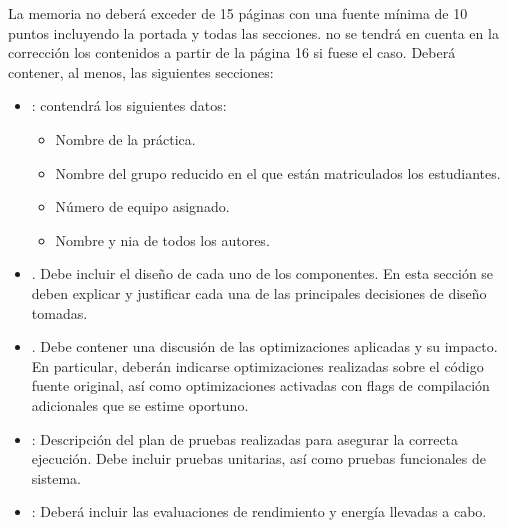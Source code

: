 La memoria no deberá exceder de 15 páginas con una fuente mínima de 10 puntos
incluyendo la portada y todas las secciones.  no se tendrá en cuenta en la
corrección los contenidos a partir de la página 16 si fuese el caso. Deberá
contener, al menos, las siguientes secciones: 

\begin{itemize}

\item {}: contendrá los siguientes datos:
  \begin{itemize}
    \item Nombre de la práctica.
    \item Nombre del grupo reducido en el que están matriculados los estudiantes.
    \item Número de equipo asignado.
    \item Nombre y nia de todos los autores.
  \end{itemize}

\item {}. 
      Debe incluir el diseño de cada uno de los componentes.
      En esta sección se deben explicar y justificar cada una de las principales 
      decisiones de diseño tomadas.

\item {}.
      Debe contener una discusión de las optimizaciones
      aplicadas y su impacto. En particular, deberán indicarse optimizaciones
      realizadas sobre el código fuente original, así como optimizaciones
      activadas con flags de compilación adicionales que se estime oportuno.

\item {}: 
      Descripción del plan de pruebas realizadas para asegurar la correcta ejecución.
      Debe incluir pruebas unitarias, así como pruebas funcionales de sistema.

\item {}: 
      Deberá incluir las evaluaciones de rendimiento y energía llevadas a cabo.


\end{itemize}
